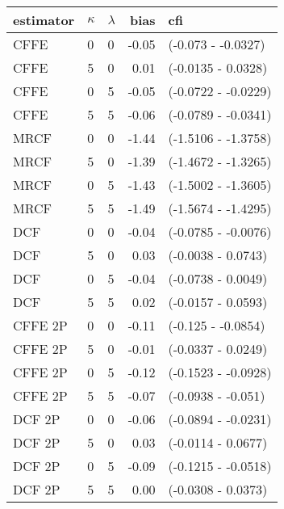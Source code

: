 \begin{tabular}{lllrl}
  \hline
estimator & $\kappa$ & $\lambda$ & bias & cfi \\ 
  \hline
CFFE  & 0 & 0 & -0.05 & (-0.073 - -0.0327) \\ 
  CFFE  & 5 & 0 & 0.01 & (-0.0135 - 0.0328) \\ 
  CFFE  & 0 & 5 & -0.05 & (-0.0722 - -0.0229) \\ 
  CFFE  & 5 & 5 & -0.06 & (-0.0789 - -0.0341) \\ 
  MRCF  & 0 & 0 & -1.44 & (-1.5106 - -1.3758) \\ 
  MRCF  & 5 & 0 & -1.39 & (-1.4672 - -1.3265) \\ 
  MRCF  & 0 & 5 & -1.43 & (-1.5002 - -1.3605) \\ 
  MRCF  & 5 & 5 & -1.49 & (-1.5674 - -1.4295) \\ 
  DCF  & 0 & 0 & -0.04 & (-0.0785 - -0.0076) \\ 
  DCF  & 5 & 0 & 0.03 & (-0.0038 - 0.0743) \\ 
  DCF  & 0 & 5 & -0.04 & (-0.0738 - 0.0049) \\ 
  DCF  & 5 & 5 & 0.02 & (-0.0157 - 0.0593) \\ 
  CFFE 2P  & 0 & 0 & -0.11 & (-0.125 - -0.0854) \\ 
  CFFE 2P  & 5 & 0 & -0.01 & (-0.0337 - 0.0249) \\ 
  CFFE 2P  & 0 & 5 & -0.12 & (-0.1523 - -0.0928) \\ 
  CFFE 2P  & 5 & 5 & -0.07 & (-0.0938 - -0.051) \\ 
  DCF 2P  & 0 & 0 & -0.06 & (-0.0894 - -0.0231) \\ 
  DCF 2P  & 5 & 0 & 0.03 & (-0.0114 - 0.0677) \\ 
  DCF 2P  & 0 & 5 & -0.09 & (-0.1215 - -0.0518) \\ 
  DCF 2P  & 5 & 5 & 0.00 & (-0.0308 - 0.0373) \\ 
   \hline
\end{tabular}
